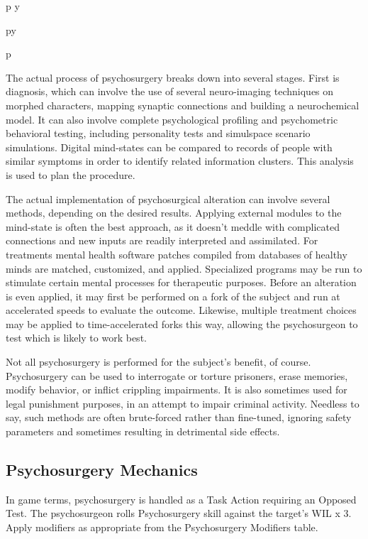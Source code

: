 p y

py

p

The actual process of psychosurgery breaks down 
into several stages. First is diagnosis, which can 
involve the use of several neuro-imaging techniques 
on morphed characters, mapping synaptic connections
and building a neurochemical model. It can
also involve complete psychological profiling  and 
psychometric behavioral testing, including personality
tests and simulspace scenario simulations. Digital
mind-states can be compared to records of people 
with similar symptoms in order to identify related 
information clusters. This analysis is used to plan 
the procedure.

The actual implementation of psychosurgical alteration
can involve several methods, depending on
the desired results. Applying external modules to the 
mind-state is often the best approach, as it doesn't 
meddle with complicated connections and new inputs 
are readily interpreted and assimilated. For treatments
mental health software patches compiled from
databases of healthy minds are matched, customized, 
and applied. Specialized programs may be run to 
stimulate certain mental processes for therapeutic 
purposes. Before an alteration is even applied, it may 
first be performed on a fork of the subject and run at 
accelerated speeds to evaluate the outcome. Likewise, 
multiple treatment choices may be applied to time-accelerated
forks this way, allowing the psychosurgeon
to test which is likely to work best.

Not all psychosurgery is performed for the subject's 
benefit, of course. Psychosurgery can be used to interrogate
or torture prisoners, erase memories, modify
behavior, or inflict crippling impairments. It is also 
sometimes used for legal punishment purposes, in 
an attempt to impair criminal activity. Needless to 
say, such methods are often brute-forced rather than 
fine-tuned, ignoring safety parameters and sometimes 
resulting in detrimental side effects.

\subsection{Psychosurgery Mechanics}

In game terms, psychosurgery is handled as a Task 
Action requiring an Opposed Test. The psychosurgeon 
rolls Psychosurgery skill against the target's WIL x 3. 
Apply modifiers as appropriate from the Psychosurgery
Modifiers table.

